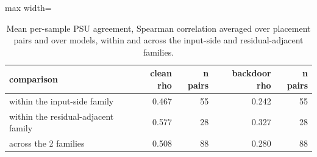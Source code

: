 \begin{table}[htbp]
\centering
\small
\caption{Mean per-sample PSU agreement, Spearman correlation averaged over placement pairs and over models, within and across the input-side and residual-adjacent families.}
\label{tab:mech-operator-agreement-family}
\begin{adjustbox}{max width=\linewidth}
\begin{tabular}{lrrrr}
\toprule
comparison & clean rho & n pairs & backdoor rho & n pairs \\
\midrule
within the input-side family & 0.467 & 55 & 0.242 & 55 \\
within the residual-adjacent family & 0.577 & 28 & 0.327 & 28 \\
across the 2 families & 0.508 & 88 & 0.280 & 88 \\
\bottomrule
\end{tabular}
\end{adjustbox}
\end{table}
